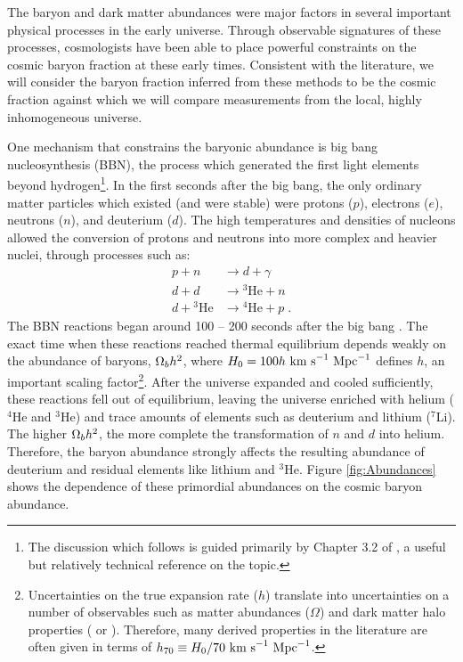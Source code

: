 The baryon and dark matter abundances were major factors in several
important physical processes in the early universe. Through observable
signatures of these processes, cosmologists have been able to place
powerful constraints on the cosmic baryon fraction at these early
times. Consistent with the literature, we will consider the baryon
fraction inferred from these methods to be the cosmic fraction against
which we will compare measurements from the local, highly
inhomogeneous universe.

One mechanism that constrains the baryonic abundance is big bang
nucleosynthesis (BBN), the process which generated the first light
elements beyond hydrogen\footnote{The discussion which follows is
  guided primarily by Chapter 3.2 of \citet{Weinberg2008}, a useful
  but relatively technical reference on the topic.}. In the first
seconds after the big bang, the only ordinary matter particles which
existed (and were stable) were protons ($p$), electrons ($e$),
neutrons ($n$), and deuterium ($d$). The high temperatures and densities of nucleons
allowed the conversion of protons and neutrons into more complex and
heavier nuclei, through processes such as:
\begin{align}
p + n &\rightarrow{} d + \gamma \nonumber \\
d + d &\rightarrow{} ^3\textrm{He} + n \nonumber \\
d +{} ^3\textrm{He} &\rightarrow{} ^4\textrm{He} + p\; .\nonumber
\end{align}
The BBN reactions began around 100 -- 200 seconds after the big bang
\citep{Weinberg2008}. The exact time when these reactions reached
thermal equilibrium depends weakly on the abundance of baryons,
$\Omega_b h^2$, where $H_0 = 100h~\textrm{km~s}^{-1}~\textrm{Mpc}^{-1}$ defines $h$, an important
scaling factor\footnote{Uncertainties on the true expansion rate ($h$)
  translate into uncertainties on a number of observables such as
  matter abundances ($\Omega$) and dark matter halo properties
  (\Mass{} or \radius{}). Therefore, many derived properties in the
  literature are often given in terms of $h_{70} \equiv{} H_0 /
  70~\textrm{km~s}^{-1}~\textrm{Mpc}^{-1}$.}. After the universe expanded and cooled sufficiently,
these reactions fell out of equilibrium, leaving the universe enriched
with helium ($^4$He and $^3$He) and trace amounts of elements such as
deuterium and lithium ($^7$Li). The higher $\Omega_b h^2$, the more
complete the transformation of $n$ and $d$ into helium. Therefore, the
baryon abundance strongly affects the resulting abundance of deuterium
and residual elements like lithium and $^3$He. Figure
\ref{fig:Abundances} shows the dependence of these primordial
abundances on the cosmic baryon abundance.

